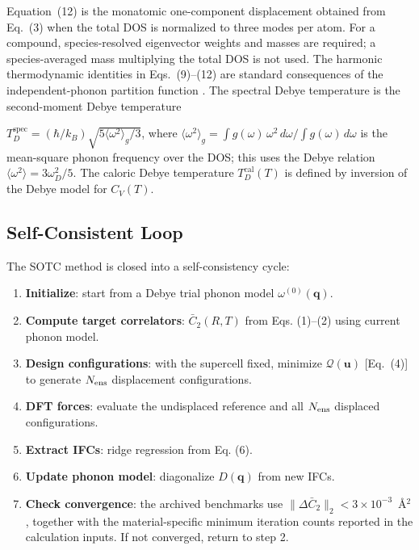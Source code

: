 \documentclass[aps,prb,reprint,amsmath,amssymb,floatfix]{revtex4-2}
\providecommand{\tightlist}{\setlength{\itemsep}{0pt}\setlength{\parskip}{0pt}}
\begin{document}
Equation~(12) is the monatomic one-component displacement obtained from
Eq.~(3) when the total DOS is normalized to three modes per atom. For a
compound, species-resolved eigenvector weights and masses are required; a
species-averaged mass multiplying the total DOS is not used. The harmonic
thermodynamic identities in Eqs.~(9)--(12) are standard consequences of the
independent-phonon partition function \cite{ref13}.
The spectral Debye temperature is the second-moment Debye temperature

\(T_D^\text{spec} = (\hbar/k_B)\sqrt{5\langle\omega^2\rangle_g/3}\),
where
\(\langle\omega^2\rangle_g = \int g(\omega)\,\omega^2\,d\omega/\int g(\omega)\,d\omega\)
is the mean-square phonon frequency over the DOS; this uses the Debye
relation \(\langle\omega^2\rangle = 3\omega_D^2/5\). The caloric Debye
temperature \(T_D^\text{cal}(T)\) is defined by inversion of the Debye
model for \(C_V(T)\).

\subsection{Self-Consistent Loop}\label{self-consistent-loop}

The SOTC method is closed into a self-consistency cycle:

\begin{enumerate}
\def\labelenumi{\arabic{enumi}.}
\tightlist
\item
  \textbf{Initialize}: start from a Debye trial phonon model
  \(\omega^{(0)}(\mathbf{q})\).
\item
  \textbf{Compute target correlators}: \(\bar{C}_2(R,T)\) from Eqs.
  (1)--(2) using current phonon model.
\item
  \textbf{Design configurations}: with the supercell fixed,
  minimize \(\mathcal Q(\mathbf u)\) [Eq.~(4)] to generate
  \(N_{\rm ens}\) displacement configurations.
\item
  \textbf{DFT forces}: evaluate the undisplaced reference
  and all \(N_{\rm ens}\) displaced configurations.
\item
  \textbf{Extract IFCs}: ridge regression from Eq. (6).
\item
  \textbf{Update phonon model}: diagonalize \(D(\mathbf{q})\) from new
  IFCs.
\item
  \textbf{Check convergence}: the archived benchmarks use
  \(\|\Delta\bar C_2\|_2<3\times10^{-3}\)~Å\(^2\), together with the
  material-specific minimum iteration counts reported in the calculation
  inputs. If not converged, return to step 2.
\end{enumerate}
\end{document}

